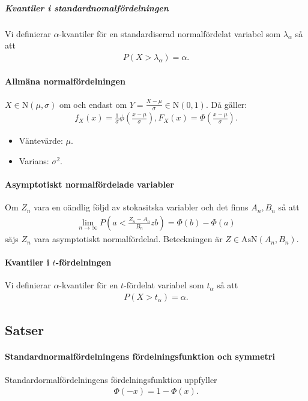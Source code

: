 \subparagraph{Kvantiler i standardnomalfördelningen}
Vi definierar $\alpha$-kvantiler för en standardiserad normalfördelat variabel som $\lambda_\alpha$ så att
\begin{align*}
	P(X > \lambda_\alpha) = \alpha.
\end{align*}

\paragraph{Allmäna normalfördelningen}
$X\in\text{N}(\mu, \sigma)$ om och endast om $Y = \frac{X - \mu}{\sigma}\in\text{N}(0, 1)$. Då gäller:
\begin{align*}
	f_X(x) = \frac{1}{\sigma}\phi\left(\frac{x - \mu}{\sigma}\right), F_X(x) = \Phi\left(\frac{x - \mu}{\sigma}\right).
\end{align*}

\begin{itemize}
	\item Väntevärde: $\mu$.
	\item Varians: $\sigma^2$.
\end{itemize}

\paragraph{Asymptotiskt normalfördelade variabler}
Om $Z_n$ vara en oändlig följd av stokasitska variabler och det finns $A_n, B_n$ så att
\begin{align*}
	\lim\limits_{n\to\infty}P\left(a < \frac{Z_n - A_n}{B_n} z b\right) = \Phi(b) - \Phi(a)
\end{align*}
säjs $Z_n$ vara asymptotiskt normalfördelad. Beteckningen är $Z\in\text{AsN}(A_n, B_n)$.

\paragraph{Kvantiler i $t$-fördelningen}
Vi definierar $\alpha$-kvantiler för en $t$-fördelat variabel som $t_\alpha$ så att
\begin{align*}
	P(X > t_\alpha) = \alpha.
\end{align*}

\subsection{Satser}

\paragraph{Standardnormalfördelningens fördelningsfunktion och symmetri}
Standardormalfördelningens fördelningsfunktion uppfyller
\begin{align*}
	\Phi(-x) = 1 - \Phi(x).
\end{align*}


